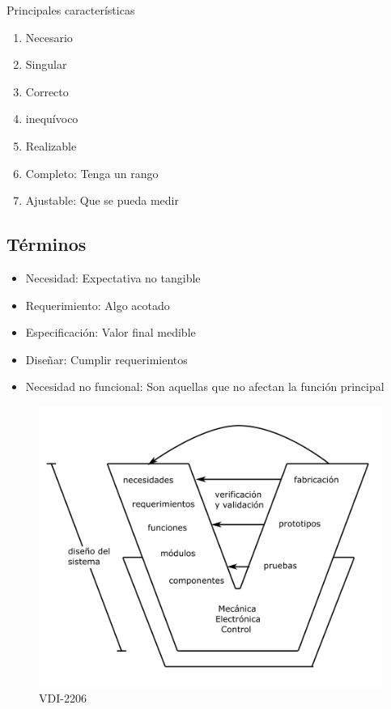  Principales características
 \begin{enumerate}
     \item Necesario
     \item Singular
     \item Correcto
     \item inequívoco
     \item Realizable
     \item Completo: Tenga un rango
     \item Ajustable: Que se pueda medir
 \end{enumerate}
 
 \subsection{Términos}
 \begin{itemize}
     \item Necesidad: Expectativa no tangible
     \item Requerimiento: Algo acotado
     \item Especificación: Valor final medible
     \item Diseñar: Cumplir requerimientos
     \item Necesidad no funcional: Son aquellas que no afectan la función principal
 \end{itemize}
 
\begin{figure}[h!]
    \centering
        \includegraphics[scale=0.5]{Proyecto Integrador Figuras/10 VDI-2206.png}
        \caption{VDI-2206}
\end{figure}